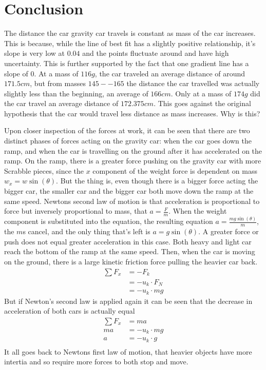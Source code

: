 \documentclass[12pt]{article}
\begin{document}
\section{Conclusion}
The distance the car gravity car travels is constant as mass of the car increases. This is because, while the line of best fit has a slightly positive relationship, it's slope is very low at \(0.04\) and the points fluctuate around and have high uncertainty. This is further supported by the fact that one gradient line has a slope of \(0\). At a mass of \(116g\), the car traveled an average distance of around \(171.5cm\), but from masses \(145--165\) the distance the car travelled was actually slightly less than the beginning, an average of \(166cm\). Only at a mass of \(174g\) did the car travel an average distance of \(172.375cm\). This goes against the original hypothesis that the car would travel less distance as mass increases. Why is this?

Upon closer inspection of the forces at work, it can be seen that there are two distinct phases of forces acting on the gravity car: when the car goes down the ramp, and when the car is travelling on the ground after it has accelerated on the ramp. On the ramp, there is a greater force pushing on the gravity car with more Scrabble pieces, since the \(x\) component of the weight force is dependent on mass \(w_x = w\sin(\theta)\). But the thing is, even though there is a bigger force acting the bigger car, the smaller car and the bigger car both move down the ramp at the same speed. Newtons second law of motion is that acceleration is proportional to force but inversely proportional to mass, that \(a=\frac{F}{m}\). When the weight component is substituted into the equation, the resulting equation \(a=\frac{mg\sin(\theta)}{m}\), the \(m\)s cancel, and the only thing that's left is \(a=g\sin(\theta)\). A greater force or push does not equal greater acceleration in this case. Both heavy and light car reach the bottom of the ramp at the same speed. Then, when the car is moving on the ground, there is a large kinetic friction force pulling the heavier car back. 
\begin{align*}
	\sum F_{x}&=-F_{k} \\
&=-u_{k}\cdot F_{N} \\
&=-u_{k}\cdot mg
\end{align*}
But if Newton's second law is applied again it can be seen that the decrease in acceleration of both cars is actually equal
\begin{align*}
\sum F_{x}&=ma\\
ma&=-u_{k}\cdot mg\\
a&=-u_{k}\cdot g\\
\end{align*}
It all goes back to Newtons first law of motion, that heavier objects have more intertia and so require more forces to both stop and move. 
\end{document}
